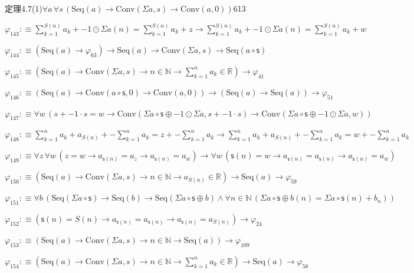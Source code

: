 \begin{fullproof}{定理4.7(1)}{$\forall a\,\forall s\,(\mathrm{Seq}(a) \to \mathrm{Conv}(\Sigma a,s) \to \mathrm{Conv}(a,0))$}{613}
\begin{abbrevlist}
\item $\varphi_{143} :\equiv {\textstyle\sum_{k=1}^{S(n)} a_{k}} + -1 \odot \Sigma a(n) = {\textstyle\sum_{k=1}^{S(n)} a_{k}} + z \to {\textstyle\sum_{k=1}^{S(n)} a_{k}} + -1 \odot \Sigma a(n) = {\textstyle\sum_{k=1}^{S(n)} a_{k}} + w$
\item $\varphi_{144} :\equiv (\mathrm{Seq}(a) \to \varphi_{63}) \to \mathrm{Seq}(a) \to \mathrm{Conv}(\Sigma a,s) \to \mathrm{Seq}(a \circ \mathsf{s})$
\item $\varphi_{145} :\equiv (\mathrm{Seq}(a) \to \mathrm{Conv}(\Sigma a,s) \to n \in \mathbb{N} \to {\textstyle\sum_{k=1}^{n} a_{k}} \in \mathbb{R}) \to \varphi_{41}$
\item $\varphi_{146} :\equiv (\mathrm{Seq}(a) \to \mathrm{Conv}(a \circ \mathsf{s},0) \to \mathrm{Conv}(a,0)) \to (\mathrm{Seq}(a) \to \mathrm{Seq}(a)) \to \varphi_{51}$
\item $\varphi_{147} :\equiv \forall w\,(s + -1 \cdot s = w \to \mathrm{Conv}(\Sigma a \circ \mathsf{s} \oplus -1 \odot \Sigma a,s + -1 \cdot s) \to \mathrm{Conv}(\Sigma a \circ \mathsf{s} \oplus -1 \odot \Sigma a,w))$
\item $\varphi_{148} :\equiv {\textstyle\sum_{k=1}^{n} a_{k}} + a_{S(n)} + -{\textstyle\sum_{k=1}^{n} a_{k}} = z + -{\textstyle\sum_{k=1}^{n} a_{k}} \to {\textstyle\sum_{k=1}^{n} a_{k}} + a_{S(n)} + -{\textstyle\sum_{k=1}^{n} a_{k}} = w + -{\textstyle\sum_{k=1}^{n} a_{k}}$
\item $\varphi_{149} :\equiv \forall z\,\forall w\,(z = w \to a_{\mathsf{s}(n)} = a_{z} \to a_{\mathsf{s}(n)} = a_{w}) \to \forall w\,(\mathsf{s}(n) = w \to a_{\mathsf{s}(n)} = a_{\mathsf{s}(n)} \to a_{\mathsf{s}(n)} = a_{w})$
\item $\varphi_{150} :\equiv (\mathrm{Seq}(a) \to \mathrm{Conv}(\Sigma a,s) \to n \in \mathbb{N} \to a_{S(n)} \in \mathbb{R}) \to \mathrm{Seq}(a) \to \varphi_{59}$
\item $\varphi_{151} :\equiv \forall b\,(\mathrm{Seq}(\Sigma a \circ \mathsf{s}) \to \mathrm{Seq}(b) \to \mathrm{Seq}(\Sigma a \circ \mathsf{s} \oplus b) \land \forall n \in \mathbb{N}\,(\Sigma a \circ \mathsf{s} \oplus b(n) = \Sigma a \circ \mathsf{s}(n) + b_{n}))$
\item $\varphi_{152} :\equiv (\mathsf{s}(n) = S(n) \to a_{\mathsf{s}(n)} = a_{\mathsf{s}(n)} \to a_{\mathsf{s}(n)} = a_{S(n)}) \to \varphi_{24}$
\item $\varphi_{153} :\equiv (\mathrm{Seq}(a) \to \mathrm{Conv}(\Sigma a,s) \to n \in \mathbb{N} \to \mathrm{Seq}(a)) \to \varphi_{109}$
\item $\varphi_{154} :\equiv (\mathrm{Seq}(a) \to \mathrm{Conv}(\Sigma a,s) \to n \in \mathbb{N} \to {\textstyle\sum_{k=1}^{n} a_{k}} \in \mathbb{R}) \to \mathrm{Seq}(a) \to \varphi_{58}$

\end{abbrevlist}
\end{fullproof}
